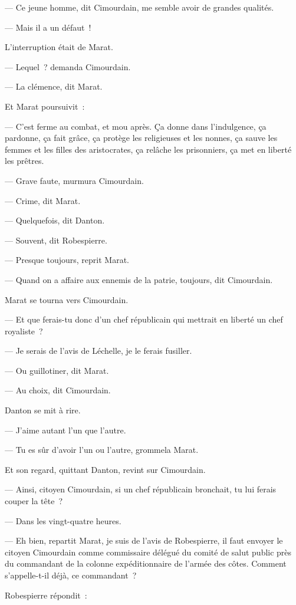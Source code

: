 \documentclass[french,twoside]{book} %
\begin{document}
— Ce jeune homme, dit Cimourdain, me semble avoir de grandes qualités.\par
— Mais il a un défaut !\par
L’interruption était de Marat.\par
— Lequel ? demanda Cimourdain.\par
— La clémence, dit Marat.\par
Et Marat poursuivit :\par
— C’est ferme au combat, et mou après. Ça donne dans l’indulgence, ça pardonne, ça fait grâce, ça protège les religieuses et les nonnes, ça sauve les femmes et les filles des aristocrates, ça relâche les prisonniers, ça met en liberté les prêtres.\par
— Grave faute, murmura Cimourdain.\par
— Crime, dit Marat.\par
— Quelquefois, dit Danton.\par
— Souvent, dit Robespierre.\par
— Presque toujours, reprit Marat.\par
— Quand on a affaire aux ennemis de la patrie, toujours, dit Cimourdain.\par
 Marat se tourna vers Cimourdain.\par
— Et que ferais-tu donc d’un chef républicain qui mettrait en liberté un chef royaliste ?\par
— Je serais de l’avis de Léchelle, je le ferais fusiller.\par
— Ou guillotiner, dit Marat.\par
— Au choix, dit Cimourdain.\par
Danton se mit à rire.\par
— J’aime autant l’un que l’autre.\par
— Tu es sûr d’avoir l’un ou l’autre, grommela Marat.\par
Et son regard, quittant Danton, revint sur Cimourdain.\par
— Ainsi, citoyen Cimourdain, si un chef républicain bronchait, tu lui ferais couper la tête ?\par
— Dans les vingt-quatre heures.\par
— Eh bien, repartit Marat, je suis de l’avis de Robespierre, il faut envoyer le citoyen Cimourdain comme commissaire délégué du comité de salut public près du commandant de la colonne expéditionnaire de l’armée des côtes. Comment s’appelle-t-il déjà, ce commandant ?\par
Robespierre répondit :\par
\end{document}

